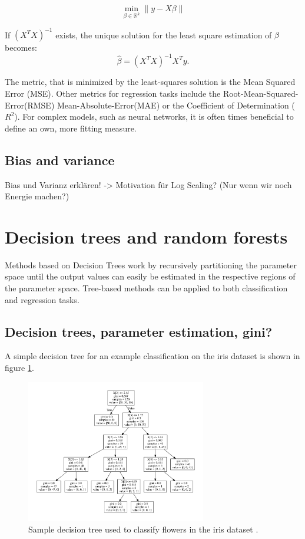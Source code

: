 \begin{equation}
	\min_{\beta\in\mathbb{R}^k} \lVert y - X\beta \rVert
	\label{eq:min_least_squares}
\end{equation}

If $(X^TX)^{-1}$ exists, the unique solution for the 
least square estimation of $\beta$ becomes:
\begin{equation}
	\hat{\beta} = (X^TX)^{-1}X^T y.
\end{equation}

The metric, that is minimized by the least-squares solution
is the Mean Squared Error (MSE).
Other metrics for regression tasks include the
Root-Mean-Squared-Error(RMSE)
Mean-Absolute-Error(MAE)
or the Coefficient of Determination ($R^2$).
For complex models, such as neural networks, it is often times 
beneficial to define an own, more fitting measure.

\subsection{Bias and variance}
Bias und Varianz erklären!
-> Motivation für Log Scaling? (Nur wenn wir noch Energie machen?)

\section{Decision trees and random forests}
Methods based on Decision Trees work by recursively partitioning
the parameter space until the output values can easily be estimated
in the respective regions of the parameter space.
Tree-based methods can be applied to both classification and regression tasks.

\subsection{Decision trees, parameter estimation, gini?}
A simple decision tree
for an example classification on the iris dataset
is shown in figure \ref{fig:03_tree}.

\begin{figure}
  \centering
  \includegraphics[width=0.7\textwidth]{Plots/decision_tree.pdf}
  \caption{Sample decision tree used to classify flowers in
  the iris dataset \cite{fisher1936use} \cite{sklearn}.}
  \label{fig:03_tree}
\end{figure}

